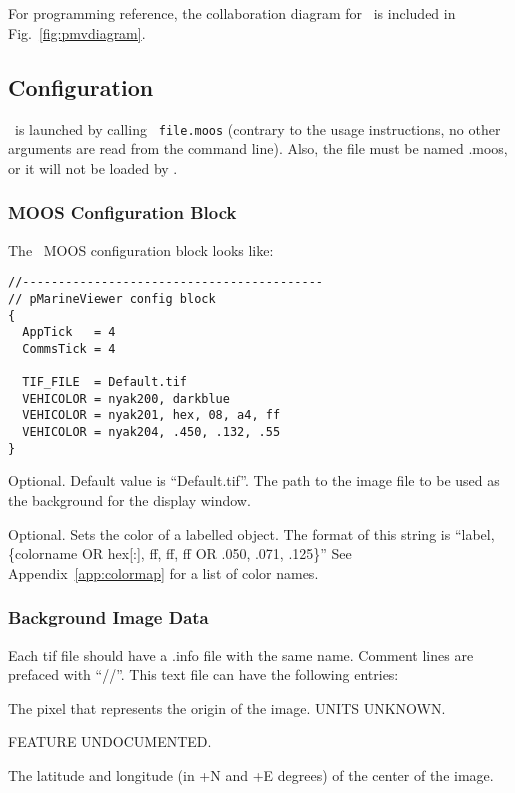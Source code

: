 \section{\pmv}
\label{pMarineViewer}
For programming reference, the collaboration diagram for \pmv\ is included in Fig.~\ref{fig:pmvdiagram}.


\subsection{Configuration}
\pmv\ is launched by calling {\tt \pmv\ file.moos} (contrary to the usage instructions, no other arguments are read from the command line).  Also, the file must be named .moos, or it will not be loaded by \pmv.

\subsubsection{MOOS Configuration Block}
The \pmv\ MOOS configuration block looks like:
\scriptsize
\begin{verbatim}
//------------------------------------------
// pMarineViewer config block
{ 
  AppTick   = 4
  CommsTick = 4

  TIF_FILE  = Default.tif  
  VEHICOLOR = nyak200, darkblue
  VEHICOLOR = nyak201, hex, 08, a4, ff
  VEHICOLOR = nyak204, .450, .132, .55
}
\end{verbatim}
\normalsize
\begin{hangpar}{\pin}{}
Optional.  Default value is ``Default.tif''.  The path to the image file to be used as the background for the display window.  
\end{hangpar}
\begin{hangpar}{\pin}{}
Optional.  Sets the color of a labelled object.  The format of this string is ``label, \{colorname OR hex[:], ff, ff, ff OR .050, .071, .125\}'' See Appendix~\ref{app:colormap} for a list of color names.
\end{hangpar}

\subsubsection{Background Image Data}
Each tif file should have a .info file with the same name.  Comment lines are prefaced with ``//''.  This text file can have the following entries:
\begin{hangpar}{\pin}{}
The pixel that represents the origin of the image.  UNITS UNKNOWN.
\end{hangpar}
\begin{hangpar}{\pin}{}
FEATURE UNDOCUMENTED.
\end{hangpar}
\begin{hangpar}{\pin}{}
The latitude and longitude (in +N and +E degrees) of the center of the image.
\end{hangpar}

